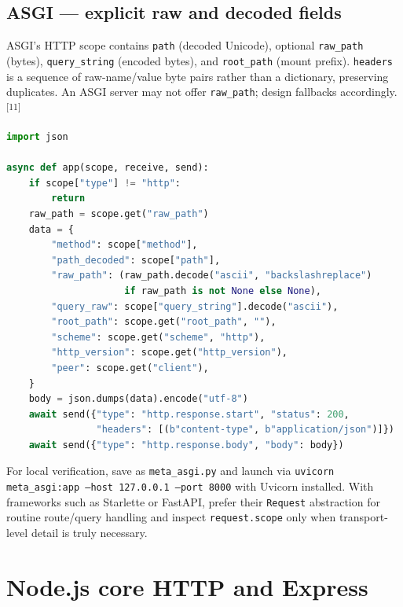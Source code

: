 \documentclass[10pt,letterpaper,oneside]{article}
\newcommand{\refs}[1]{\textsuperscript{\color{blue}[#1]}}
\newcommand{\code}[1]{\texttt{#1}}
\begin{document}
\subsection{ASGI --- explicit raw and decoded fields}
ASGI's HTTP scope contains \code{path} (decoded Unicode), optional \code{raw\_path} (bytes), \code{query\_string} (encoded bytes), and \code{root\_path} (mount prefix). \code{headers} is a sequence of raw-name/value byte pairs rather than a dictionary, preserving duplicates. An ASGI server may not offer \code{raw\_path}; design fallbacks accordingly.\refs{11}
\begin{lstlisting}[language=Python,caption={Minimal ASGI HTTP endpoint (run with an ASGI server)}]
import json

async def app(scope, receive, send):
    if scope["type"] != "http":
        return
    raw_path = scope.get("raw_path")
    data = {
        "method": scope["method"],
        "path_decoded": scope["path"],
        "raw_path": (raw_path.decode("ascii", "backslashreplace")
                     if raw_path is not None else None),
        "query_raw": scope["query_string"].decode("ascii"),
        "root_path": scope.get("root_path", ""),
        "scheme": scope.get("scheme", "http"),
        "http_version": scope.get("http_version"),
        "peer": scope.get("client"),
    }
    body = json.dumps(data).encode("utf-8")
    await send({"type": "http.response.start", "status": 200,
                "headers": [(b"content-type", b"application/json")]})
    await send({"type": "http.response.body", "body": body})
\end{lstlisting}
For local verification, save as \code{meta\_asgi.py} and launch via \code{uvicorn meta\_asgi:app --host 127.0.0.1 --port 8000} with Uvicorn installed. With frameworks such as Starlette or FastAPI, prefer their \code{Request} abstraction for routine route/query handling and inspect \code{request.scope} only when transport-level detail is truly necessary.

\section{Node.js core HTTP and Express}
\end{document}
